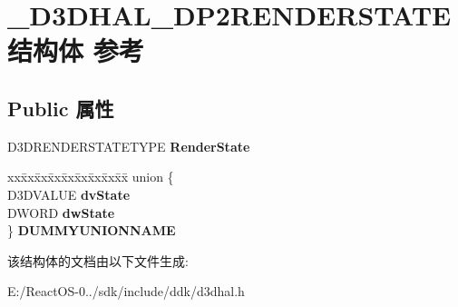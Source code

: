 \hypertarget{struct___d3_d_h_a_l___d_p2_r_e_n_d_e_r_s_t_a_t_e}{}\section{\+\_\+\+D3\+D\+H\+A\+L\+\_\+\+D\+P2\+R\+E\+N\+D\+E\+R\+S\+T\+A\+T\+E结构体 参考}
\label{struct___d3_d_h_a_l___d_p2_r_e_n_d_e_r_s_t_a_t_e}
\subsection*{Public 属性}
\begin{DoxyCompactItemize}
\item 
\mbox{\label{struct___d3_d_h_a_l___d_p2_r_e_n_d_e_r_s_t_a_t_e_a4da956f3331f74fbb7103e1791323477}} 
D3\+D\+R\+E\+N\+D\+E\+R\+S\+T\+A\+T\+E\+T\+Y\+PE {\bfseries Render\+State}
\item 
\mbox{\label{struct___d3_d_h_a_l___d_p2_r_e_n_d_e_r_s_t_a_t_e_ae6dd00f911a4fd1b979d4ef1c633af77}} 
\begin{tabbing}
xx\=xx\=xx\=xx\=xx\=xx\=xx\=xx\=xx\=\kill
union \{\\
\>D3DVALUE {\bfseries dvState}\\
\>DWORD {\bfseries dwState}\\
\} {\bfseries DUMMYUNIONNAME}\\

\end{tabbing}\end{DoxyCompactItemize}


该结构体的文档由以下文件生成\+:\begin{DoxyCompactItemize}
\item 
E\+:/\+React\+O\+S-\/0../sdk/include/ddk/d3dhal.\+h\end{DoxyCompactItemize}
